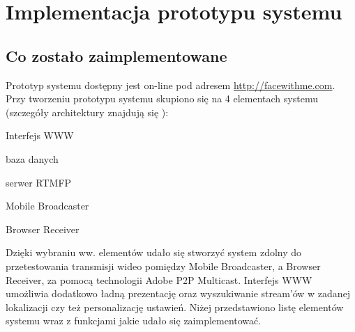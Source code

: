 \chapter{Implementacja prototypu systemu}
\label{cha:ImplementacjaPrototypu}

\section{Co zostało zaimplementowane}

Prototyp systemu dostępny jest on-line pod adresem \url{http://facewithme.com}. Przy tworzeniu prototypu systemu skupiono się na 4 elementach systemu (szczegóły architektury znajdują się ):

\begin{packed_item}
    \item{Interfejs WWW}
    \item{baza danych}
    \item{serwer RTMFP}
    \item{Mobile Broadcaster}
    \item{Browser Receiver}
\end{packed_item}

Dzięki wybraniu ww. elementów udało się stworzyć system zdolny do przetestowania transmisji wideo pomiędzy Mobile Broadcaster, a Browser Receiver, za pomocą technologii Adobe P2P Multicast. Interfejs WWW umożliwia dodatkowo ładną prezentację oraz wyszukiwanie stream'ów w zadanej lokalizacji czy też personalizację ustawień. Niżej przedstawiono listę elementów systemu wraz z funkcjami jakie udało się zaimplementować.

